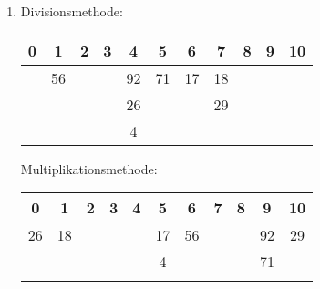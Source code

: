 \documentclass[11pt,a4paper]{article}
\begin{document}
\begin{loesung}
    \begin{enumerate}
        \item Divisionsmethode:
        \begin{table}[h!]
            \centering
            \begin{tabular}{cccc|c|cccccc}
            \hline
            \multicolumn{1}{|c|}{\textbf{0}} & \multicolumn{1}{c|}{\textbf{1}} & \multicolumn{1}{c|}{\textbf{2}} & \textbf{3} & \textbf{4} & \multicolumn{1}{c|}{\textbf{5}} & \multicolumn{1}{c|}{\textbf{6}} & \multicolumn{1}{c|}{\textbf{7}} & \multicolumn{1}{c|}{\textbf{8}} & \multicolumn{1}{c|}{\textbf{9}} & \multicolumn{1}{c|}{\textbf{10}} \\ \hline
            \multicolumn{1}{c|}{} & \multicolumn{1}{c|}{56} &  &  & 92 & \multicolumn{1}{c|}{71} & \multicolumn{1}{c|}{17} & \multicolumn{1}{c|}{18} &  &  &  \\ \cline{2-2} \cline{5-8}
            &  &  &  & 26 &  & \multicolumn{1}{c|}{} & \multicolumn{1}{c|}{29} &  &  &  \\ \cline{5-5} \cline{8-8}
            &  &  &  & 4 &  &  &  &  &  &  \\ \cline{5-5}
            \end{tabular}
        \end{table} 
        \FloatBarrier
        Multiplikationsmethode:
        \begin{table}[h!]
            \centering
            \begin{tabular}{ccccccccccc}
            \hline
            \multicolumn{1}{|c|}{\textbf{0}} & \multicolumn{1}{c|}{\textbf{1}} & \multicolumn{1}{c|}{\textbf{2}} & \multicolumn{1}{c|}{\textbf{3}} & \multicolumn{1}{c|}{\textbf{4}} & \multicolumn{1}{c|}{\textbf{5}} & \multicolumn{1}{c|}{\textbf{6}} & \multicolumn{1}{c|}{\textbf{7}} & \multicolumn{1}{c|}{\textbf{8}} & \multicolumn{1}{c|}{\textbf{9}} & \multicolumn{1}{c|}{\textbf{10}} \\ \hline
            \multicolumn{1}{|c|}{26} & \multicolumn{1}{c|}{18} &  &  & \multicolumn{1}{c|}{} & \multicolumn{1}{c|}{17} & \multicolumn{1}{c|}{56} &  & \multicolumn{1}{c|}{} & \multicolumn{1}{c|}{92} & \multicolumn{1}{c|}{29} \\ \cline{1-2} \cline{6-7} \cline{10-11} 
            &  &  &  & \multicolumn{1}{c|}{} & \multicolumn{1}{c|}{4} &  &  & \multicolumn{1}{c|}{} & \multicolumn{1}{c|}{71} &  \\ \cline{6-6} \cline{10-10}
            &  &  &  &  &  &  &  &  &  & 

\end{tabular}
\end{table}
\end{enumerate}
\end{loesung}
\end{document}
